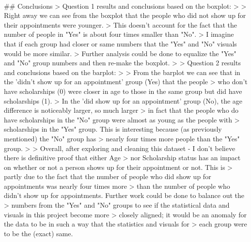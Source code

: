 \documentclass[11pt]{article}
\begin{document}
    \begin{center}
    \end{center}
    { \hspace*{\fill} \\}
    
     \#\# Conclusions \textgreater{} Question 1 results and conclusions
based on the boxplot: \textgreater{} \textgreater{} Right away we can
see from the boxplot that the people who did not show up for their
appointments were younger. \textgreater{} This doesn't account for the
fact that the number of people in "Yes" is about four times smaller than
"No". \textgreater{} I imagine that if each group had closer or same
numbers that the "Yes" and "No" visuals would be more similar.
\textgreater{} Further analysis could be done to equalize the "Yes" and
"No" group numbers and then re-make the boxplot. \textgreater{}
\textgreater{} Question 2 results and conclusions based on the barplot:
\textgreater{} \textgreater{} From the barplot we can see that in the
'didn't show up for an appointment' group (Yes) that the people
\textgreater{} who don't have scholarships (0) were closer in age to
those in the same group but did have scholarships (1). \textgreater{} In
the 'did show up for an appointment' group (No), the age difference is
noticeably larger, so much larger \textgreater{} in fact that the people
who do have scholarships in the "No" group were almost as young as the
people with \textgreater{} scholarships in the "Yes" group. This is
interesting because (as previously mentioned) the "No" group has
\textgreater{} nearly four times more people than the "Yes" group.
\textgreater{} \textgreater{} Overall, after exploring and cleaning this
dataset - I don't believe there is definitive proof that either Age
\textgreater{} nor Scholarship status has an impact on whether or not a
person shows up for their appointment or not. This is \textgreater{}
partly due to the fact that the number of people who did show up for
appointments was nearly four times more \textgreater{} than the number
of people who didn't show up for appointments. Further work could be
done to balance out the \textgreater{} numbers from the "Yes" and "No"
groups to see if the statistical data and visuals in this project become
more \textgreater{} closely aligned; it would be an anomaly for the data
to be in such a way that the statistics and visuals for \textgreater{}
each group were to be the (exact) same.


    
    
    
    
\end{document}
